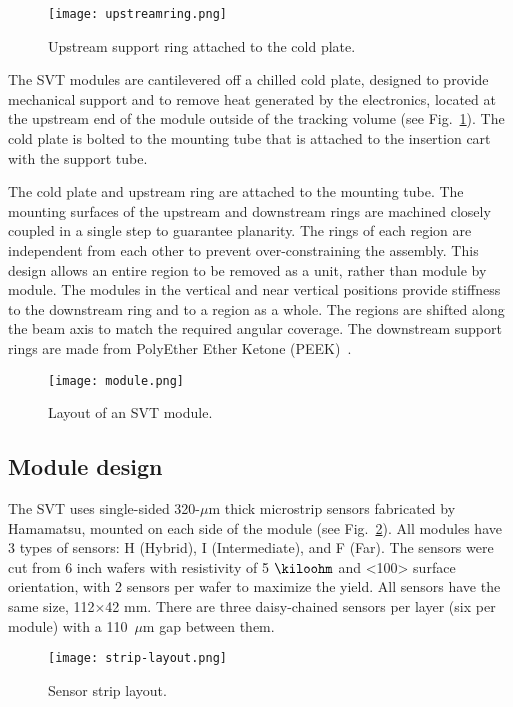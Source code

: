 \begin{figure}[hbt] 
\centering 
\texttt{[image: upstreamring.png]}
\caption{Upstream support ring attached to the cold plate.}
\label{fig:upstreamring}
\end{figure}

 The SVT modules are cantilevered off a chilled cold plate, designed to provide mechanical support and to remove heat generated by the electronics, located at the upstream end of the module outside of the tracking volume (see Fig.~\ref{fig:upstreamring}). The cold plate is bolted to the mounting tube that is attached to the insertion cart with the support tube. 
 
The cold plate and upstream ring are attached to the mounting tube. The mounting surfaces of the upstream and downstream rings are machined closely coupled in a single step to guarantee planarity. The rings of each region are independent from each other to prevent over-constraining the assembly. This design allows an entire region to be removed as a unit, rather than module by module. The modules in the vertical and near vertical positions provide stiffness to the downstream ring and to a region as a whole. The regions are shifted along the beam axis to match the required angular coverage. The downstream support rings are made from PolyEther Ether Ketone (PEEK)~\cite{NIMVCC}. 

\begin{figure}[hbt] 
\centering 
\texttt{[image: module.png]}
\caption{Layout of an SVT module.}
\label{fig:module}
\end{figure}

\subsection{Module design}

The SVT uses single-sided 320-$\mu$m thick microstrip sensors fabricated by Hamamatsu, mounted on each side of the module (see Fig.~\ref{fig:module}). All modules have 3 types of sensors: H (Hybrid), I (Intermediate), and F (Far). The sensors were cut from 6 inch wafers with resistivity of 5 $\kiloohm$ and <100> surface orientation, with 2 sensors per wafer to maximize the yield. All sensors have the same size, 112$\times$42 mm. There are three daisy-chained sensors per layer (six per module) with a 110~$\mu$m gap between them. 

\begin{figure}[hbt] 
\centering 
\texttt{[image: strip-layout.png]}
\caption{Sensor strip layout.}
\label{fig:strip-layout}
\end{figure}

